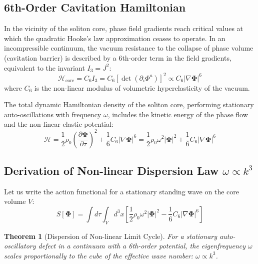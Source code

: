 \documentclass[12pt,a4paper]{article}
\newtheorem{theorem}{Theorem}
\begin{document}
	\subsection{6th-Order Cavitation Hamiltonian}
	In the vicinity of the soliton core, phase field gradients reach critical values at which the quadratic Hooke's law approximation ceases to operate. In an incompressible continuum, the vacuum resistance to the collapse of phase volume (cavitation barrier) is described by a 6th-order term in the field gradients, equivalent to the invariant $I_3 = J^2$:
	\begin{equation}
		\mathcal{H}_{\text{core}} = C_6 I_3 = C_6 \left[ \det\left(\partial_i \Phi^a\right) \right]^2 \propto C_6 |\nabla \boldsymbol{\Phi}|^6
	\end{equation}
	where $C_6$ is the non-linear modulus of volumetric hyperelasticity of the vacuum.
	
	The total dynamic Hamiltonian density of the soliton core, performing stationary auto-oscillations with frequency $\omega$, includes the kinetic energy of the phase flow and the non-linear elastic potential:
	\begin{equation}
		\mathcal{H} = \frac{1}{2} \rho_0 \left( \frac{\partial \boldsymbol{\Phi}}{\partial \tau} \right)^2 + \frac{1}{6} C_6 |\nabla \boldsymbol{\Phi}|^6 = \frac{1}{2} \rho_0 \omega^2 |\boldsymbol{\Phi}|^2 + \frac{1}{6} C_6 |\nabla \boldsymbol{\Phi}|^6
	\end{equation}
	
	\subsection{Derivation of Non-linear Dispersion Law $\omega \propto k^3$}
	Let us write the action functional for a stationary standing wave on the core volume $V$:
	\begin{equation}
		S[\boldsymbol{\Phi}] = \int d\tau \int_V d^3x \left[ \frac{1}{2} \rho_0 \omega^2 |\boldsymbol{\Phi}|^2 - \frac{1}{6} C_6 |\nabla \boldsymbol{\Phi}|^6 \right]
	\end{equation}
	
	\begin{theorem}[Dispersion of Non-linear Limit Cycle]
		For a stationary auto-oscillatory defect in a continuum with a 6th-order potential, the eigenfrequency $\omega$ scales proportionally to the cube of the effective wave number: $\omega \propto k^3$.
	\end{theorem}
	
\end{document}
